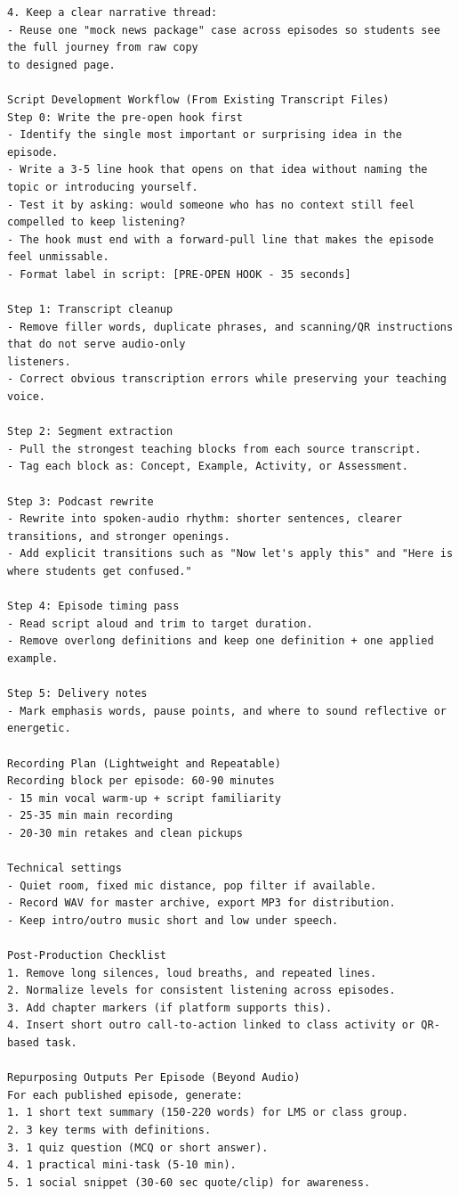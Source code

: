{\begin{Verbatim}
4. Keep a clear narrative thread:
- Reuse one "mock news package" case across episodes so students see the full journey from raw copy
to designed page.

Script Development Workflow (From Existing Transcript Files)
Step 0: Write the pre-open hook first
- Identify the single most important or surprising idea in the episode.
- Write a 3-5 line hook that opens on that idea without naming the topic or introducing yourself.
- Test it by asking: would someone who has no context still feel compelled to keep listening?
- The hook must end with a forward-pull line that makes the episode feel unmissable.
- Format label in script: [PRE-OPEN HOOK - 35 seconds]

Step 1: Transcript cleanup
- Remove filler words, duplicate phrases, and scanning/QR instructions that do not serve audio-only
listeners.
- Correct obvious transcription errors while preserving your teaching voice.

Step 2: Segment extraction
- Pull the strongest teaching blocks from each source transcript.
- Tag each block as: Concept, Example, Activity, or Assessment.

Step 3: Podcast rewrite
- Rewrite into spoken-audio rhythm: shorter sentences, clearer transitions, and stronger openings.
- Add explicit transitions such as "Now let's apply this" and "Here is where students get confused."

Step 4: Episode timing pass
- Read script aloud and trim to target duration.
- Remove overlong definitions and keep one definition + one applied example.

Step 5: Delivery notes
- Mark emphasis words, pause points, and where to sound reflective or energetic.

Recording Plan (Lightweight and Repeatable)
Recording block per episode: 60-90 minutes
- 15 min vocal warm-up + script familiarity
- 25-35 min main recording
- 20-30 min retakes and clean pickups

Technical settings
- Quiet room, fixed mic distance, pop filter if available.
- Record WAV for master archive, export MP3 for distribution.
- Keep intro/outro music short and low under speech.

Post-Production Checklist
1. Remove long silences, loud breaths, and repeated lines.
2. Normalize levels for consistent listening across episodes.
3. Add chapter markers (if platform supports this).
4. Insert short outro call-to-action linked to class activity or QR-based task.

Repurposing Outputs Per Episode (Beyond Audio)
For each published episode, generate:
1. 1 short text summary (150-220 words) for LMS or class group.
2. 3 key terms with definitions.
3. 1 quiz question (MCQ or short answer).
4. 1 practical mini-task (5-10 min).
5. 1 social snippet (30-60 sec quote/clip) for awareness.


\end{Verbatim}}
